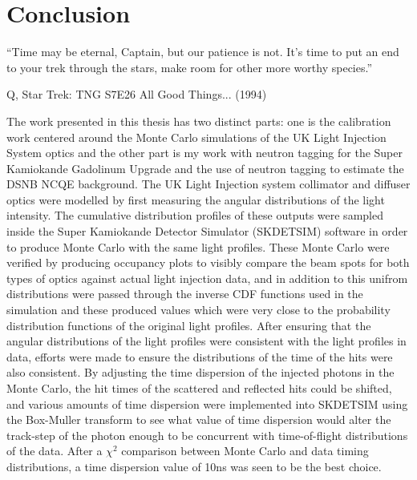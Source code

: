\chapter{Conclusion}
\epigraph{``Time may be eternal, Captain, but our patience is not. It's time to put an end to your trek through the stars, make room for other more worthy species.''}{Q, Star Trek: TNG S7E26 All Good Things... (1994)}
\label{chp:conc}

The work presented in this thesis has two distinct parts: one is the calibration work centered around the Monte Carlo simulations of the UK Light Injection System optics and the other part is my work with neutron tagging for the Super Kamiokande Gadolinum Upgrade and the use of neutron tagging to estimate the DSNB NCQE background. 
\newline
The UK Light Injection system collimator and diffuser optics were modelled by first measuring the angular distributions of the light intensity. The cumulative distribution profiles of these outputs were sampled inside the Super Kamiokande Detector Simulator (SKDETSIM) software in order to produce Monte Carlo with the same light profiles. These Monte Carlo were verified by producing occupancy plots to visibly compare the beam spots for both types of optics against actual light injection data, and in addition to this unifrom distributions were passed through the inverse CDF functions used in the simulation and these produced values which were very close to the probability distribution functions of the original light profiles. After ensuring that the angular distributions of the light profiles were consistent with the light profiles in data, efforts were made to ensure the distributions of the time of the hits were also consistent. By adjusting the time dispersion of the injected photons in the Monte Carlo, the hit times of the scattered and reflected hits could be shifted, and various amounts of time dispersion were implemented into SKDETSIM using the Box-Muller transform to see what value of time dispersion would alter the track-step of the photon enough to be concurrent with time-of-flight distributions of the data. After a $\chi^{2}$ comparison between Monte Carlo and data timing distributions, a time dispersion value of 10ns was seen to be the best choice.
\newline
